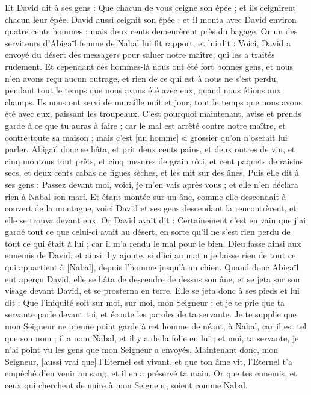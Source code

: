 \begin{multicols}{2}
Et David dit à ses gens : Que chacun de vous ceigne son épée ; et ils ceignirent chacun leur épée. David aussi ceignit son épée : et il monta avec David environ quatre cents hommes ; mais deux cents demeurèrent près du bagage.
Or un des serviteurs d'Abigaïl femme de Nabal lui fit rapport, et lui dit : Voici, David a envoyé du désert des messagers pour saluer notre maître, qui les a traités rudement.
Et cependant ces hommes-là nous ont été fort bonnes gens, et nous n'en avons reçu aucun outrage, et rien de ce qui est à nous ne s'est perdu, pendant tout le temps que nous avons été avec eux, quand nous étions aux champs.
Ils nous ont servi de muraille nuit et jour, tout le temps que nous avons été avec eux, paissant les troupeaux.
C'est pourquoi maintenant, avise et prends garde à ce que tu auras à faire ; car le mal est arrêté contre notre maître, et contre toute sa maison ; mais c'est [un homme] si grossier qu'on n'oserait lui parler.
Abigaïl donc se hâta, et prit deux cents pains, et deux outres de vin, et cinq moutons tout prêts, et cinq mesures de grain rôti, et cent paquets de raisins secs, et deux cents cabas de figues sèches, et les mit sur des ânes.
Puis elle dit à ses gens : Passez devant moi, voici, je m'en vais après vous ; et elle n'en déclara rien à Nabal son mari.
Et étant montée sur un âne, comme elle descendait à couvert de la montagne, voici David et ses gens descendant la rencontrèrent, et elle se trouva devant eux.
Or David avait dit : Certainement c'est en vain que j'ai gardé tout ce que celui-ci avait au désert, en sorte qu'il ne s'est rien perdu de tout ce qui était à lui ; car il m'a rendu le mal pour le bien.
Dieu fasse ainsi aux ennemis de David, et ainsi il y ajoute, si d'ici au matin je laisse rien de tout ce qui appartient à [Nabal], depuis l'homme jusqu'à un chien.
Quand donc Abigaïl eut aperçu David, elle se hâta de descendre de dessus son âne, et se jeta sur son visage devant David, et se prosterna en terre.
Elle se jeta donc à ses pieds et lui dit : Que l'iniquité soit sur moi, sur moi, mon Seigneur ; et je te prie que ta servante parle devant toi, et écoute les paroles de ta servante.
Je te supplie que mon Seigneur ne prenne point garde à cet homme de néant, à Nabal, car il est tel que son nom ; il a nom Nabal, et il y a de la folie en lui ; et moi, ta servante, je n'ai point vu les gens que mon Seigneur a envoyés.
Maintenant donc, mon Seigneur, [aussi vrai que] l'Eternel est vivant, et que ton âme vit, l'Eternel t'a empêché d'en venir au sang, et il en a préservé ta main. Or que tes ennemis, et ceux qui cherchent de nuire à mon Seigneur, soient comme Nabal.

\end{multicols}
